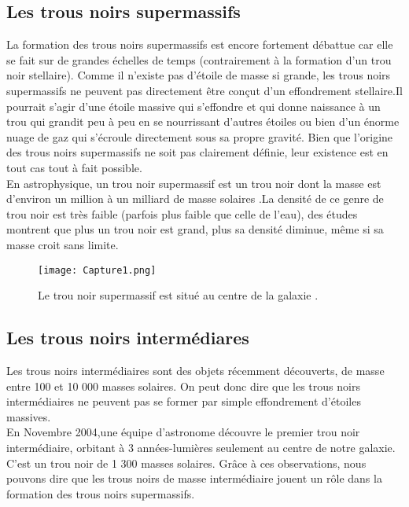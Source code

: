 \documentclass[12pt,  a4paper, openright]{report} %
\begin{document}
	\subsection{ Les trous noirs supermassifs }
	La formation des trous noirs supermassifs est encore fortement débattue car elle se fait sur de grandes échelles de temps (contrairement à la formation d’un trou noir stellaire). Comme il n’existe pas d’étoile de masse si grande, les trous noirs supermassifs ne peuvent pas directement être conçut d’un effondrement stellaire.Il pourrait s’agir d’une étoile massive qui s’effondre et qui donne naissance à un trou qui grandit peu à peu en se nourrissant d’autres étoiles ou bien d’un énorme nuage de gaz qui s’écroule directement sous sa propre gravité. Bien que l’origine des trous noirs supermassifs ne soit pas clairement définie, leur existence est en tout cas tout à fait possible.\\ 
	En astrophysique, un trou noir supermassif est un trou noir dont la masse est d’environ un million à un milliard de masse solaires .La densité de ce genre de trou noir  est très faible (parfois plus faible que celle de l’eau), des études montrent que plus un trou noir est grand, plus sa densité diminue, même si sa masse croit sans limite.
	\begin{figure}[H]
			\begin{center}
		\texttt{[image: Capture1.png]}
		
	\end{center}

	 \caption{Le trou noir supermassif est situé au centre de la galaxie .}
	
	\end{figure}
	\subsection{ Les trous noirs intermédiares }
	Les trous noirs intermédiaires sont des objets récemment découverts, de masse entre 100 et
	10 000 masses solaires. On peut donc dire que les trous noirs intermédiaires ne peuvent pas se former par simple effondrement d’étoiles massives.\\
	En Novembre 2004,une équipe d’astronome découvre le premier trou noir intermédiaire, orbitant à 3 années-lumières seulement au centre de notre galaxie. C’est un trou noir de 1 300 masses solaires. Grâce à ces observations, nous pouvons dire que les trous noirs de masse intermédiaire jouent un rôle dans la formation des trous noirs supermassifs.
\end{document}
